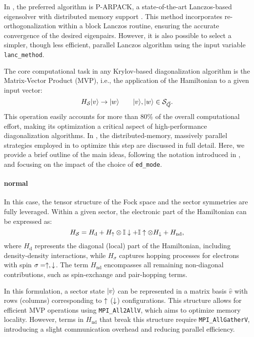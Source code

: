 \documentclass[edipack2.tex]{subfiles}
\begin{document}
In \NAME, the preferred algorithm is P-ARPACK, a state-of-the-art
Lanczos-based eigensolver with distributed memory support
\cite{P-Arpack}. This method incorporates re-orthogonalization within
a block Lanczos routine, ensuring the accurate convergence of the
desired eigenpairs. However, it is also possible to select a simpler,
though less efficient, parallel Lanczos algorithm using the input
variable {\tt lanc\_method}.

The core computational task in any Krylov-based diagonalization
algorithm is the Matrix-Vector Product (MVP), i.e., the application
of the Hamiltonian to a given input vector:
\begin{equation}
H_{\cal S} |v\rangle \to |w\rangle\qquad |v\rangle,|w\rangle\in {\cal S}_{\vec{Q}}.
\end{equation}
This operation easily accounts for more than 80\% of the overall
computational effort, making its optimization a critical aspect of
high-performance diagonalization algorithms. In ,
the distributed-memory, massively parallel strategies employed in \NAME
to optimize this step are discussed in full detail. Here, we provide
a brief outline of the main ideas, following the notation introduced
in , and focusing on the impact of the choice
of {\tt ed\_mode}.




\paragraph{\bf normal}
In this case, the tensor structure of the Fock space and the sector
symmetries are fully leveraged. Within a given sector, the electronic
part of the Hamiltonian can be expressed as:
\begin{equation}
H_{\cal S} = H_\mathrm{d} + H_\uparrow\otimes \mathbb{I}\downarrow + \mathbb{I}\uparrow\otimes
H_\downarrow + H_\mathrm{nd},
\label{HssNormal}
\end{equation}
where $H_\mathrm{d}$ represents the diagonal (local) part of the
Hamiltonian, including density-density interactions, while
$H_\sigma$ captures hopping processes for electrons with spin
$\sigma=\uparrow,\downarrow$. The term $H_\mathrm{nd}$ encompasses all remaining
non-diagonal contributions, such as spin-exchange and pair-hopping
terms.

In this formulation, a sector state $|v\rangle$ can be
represented in a matrix basis $\hat{v}$ with rows (columns)
corresponding to $\uparrow$ ($\downarrow$) configurations. This structure allows
for efficient MVP operations using {\tt MPI\_All2AllV}, which aims to
optimize memory locality. However, terms in $H_\mathrm{nd}$ that
break this structure require {\tt MPI\_AllGatherV}, introducing a
slight communication overhead and reducing parallel efficiency.
\end{document}
